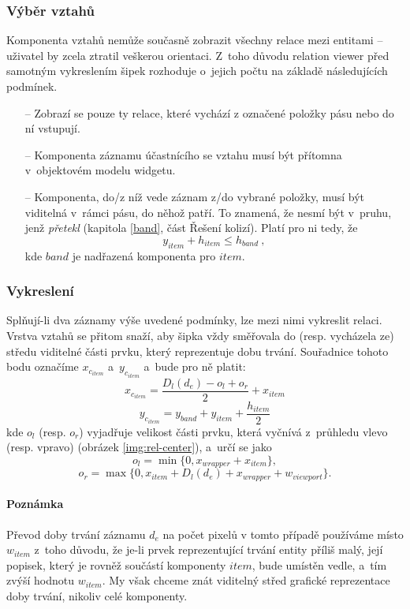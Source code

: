 			\subsubsection*{Výběr vztahů}
			\vbox{Komponenta vztahů nemůže současně zobrazit všechny relace mezi entitami -- uživatel by zcela ztratil veškerou orientaci. Z~toho důvodu relation viewer před samotným vykreslením šipek rozhoduje o~jejich počtu na základě následujících podmínek.}
			\begin{itemize}
				\item[--] Zobrazí se pouze ty relace, které vychází z označené položky pásu nebo do ní vstupují.
				\item[--] Komponenta záznamu účastnícího se vztahu musí být přítomna v~objektovém modelu wid\-getu.
				\item[--] Komponenta, do/z níž vede záznam z/do vybrané položky, musí být viditelná v~rámci pásu, do něhož patří. To znamená, že nesmí být v~pruhu, jenž \emph{přetekl} (kapitola \ref{band}, část Řešení kolizí). Platí pro ni tedy, že $$y_{item} + h_{item} \le h_{band}\ ,$$ kde $band$ je nadřazená komponenta pro $item$.
			\end{itemize}
			
			\subsubsection*{Vykreslení}
			Splňují-li dva záznamy výše uvedené podmínky, lze mezi nimi vykreslit relaci. Vrstva vztahů se přitom snaží, aby šipka vždy směřovala do (resp. vycházela ze) středu  viditelné části prvku, který reprezentuje dobu trvání. Souřadnice tohoto bodu označíme $x_{c_{item}}$ a~$y_{c_{item}}$ a~bude pro ně platit:
			\begin{equation}
			x_{c_{item}} = \frac{D_l(d_e) - o_l + o_r}{2}+x_{item}
			\end{equation}
			\begin{equation}
			y_{c_{item}} = y_{band} + y_{item} + \frac{h_{item}}{2}
			\end{equation}
			kde $o_l$ (resp. $o_r$) vyjadřuje velikost části prvku, která vyčnívá z~průhledu vlevo (resp. vpravo) (obrázek \ref{img:rel-center}), a~určí se jako
			$$o_l = \min\{0, x_{wrapper} + x_{item}\} ,$$
			$$o_r = \max\{0, x_{item} + D_l(d_e) + x_{wrapper} + w_{viewport}\} .$$
			
			\paragraph{Poznámka} Převod doby trvání záznamu $d_e$ na počet pixelů v tomto případě používáme místo $w_{item}$ z~toho důvodu, že je-li prvek reprezentující trvání entity příliš malý, její popisek, který je rovněž součástí komponenty $item$, bude umístěn vedle, a~tím zvýší hodnotu $w_{item}$. My však chceme znát viditelný střed grafické reprezentace doby trvání, nikoliv celé komponenty.
			
